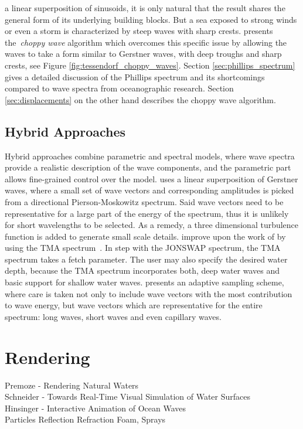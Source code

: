 a linear superposition of sinusoids, it is only natural that the result shares
the general form of its underlying building blocks. But a sea exposed to strong
winds or even a storm is characterized by steep waves with sharp crests.
\cite{course:simulatingocean} presents the~\emph{choppy wave} algorithm which
overcomes this specific issue by allowing the waves to take a form similar to
Gerstner waves, with deep troughs and sharp crests, see Figure
\ref{fig:tessendorf_choppy_waves}.
Section \ref{sec:phillips_spectrum} gives a detailed discussion of the Phillips
spectrum and its shortcomings compared to wave spectra from oceanographic
research. Section \ref{sec:displacements} on the other hand describes the choppy
wave algorithm.

\subsection{Hybrid Approaches}
Hybrid approaches combine parametric and spectral models, where wave spectra
provide a realistic description of the wave components, and the parametric part
allows fine-grained control over the model.
\citeauthor{Thon:2000}\citep{Thon:2000,Thon:2002} uses a linear superposition
of Gerstner waves, where a small set of wave vectors and corresponding
amplitudes is picked from a directional Pierson-Moskowitz spectrum. Said wave
vectors need to be representative for a large part of the energy of the
spectrum, thus it is unlikely for short wavelengths to be selected. As a remedy,
a three dimensional turbulence function \citep{Perlin:1985} is added to generate
small scale details. \cite{lee:2007} improve upon the work of
\citeauthor{Thon:2000} by using the TMA spectrum~\citep{Hughes:1984}. In step
with the JONSWAP spectrum, the TMA spectrum takes a fetch parameter. The user
may also specify the desired water depth, because the TMA spectrum incorporates
both, deep water waves and basic support for shallow water waves.
\cite{article:frechot2007} presents an adaptive sampling scheme, where care is
taken not only to include wave vectors with the most contribution to wave
energy, but wave vectors which are representative for the entire spectrum:
long waves, short waves and even capillary waves.

\section{Rendering}
%
Premoze - Rendering Natural Waters \cite{Premoze:2000}\\
Schneider - Towards Real-Time Visual Simulation of Water Surfaces \cite{Schneider:2001}\\
Hinsinger - Interactive Animation of Ocean Waves \cite{Hinsinger:2002}\\
Particles
Reflection
Refraction
Foam, Sprays







